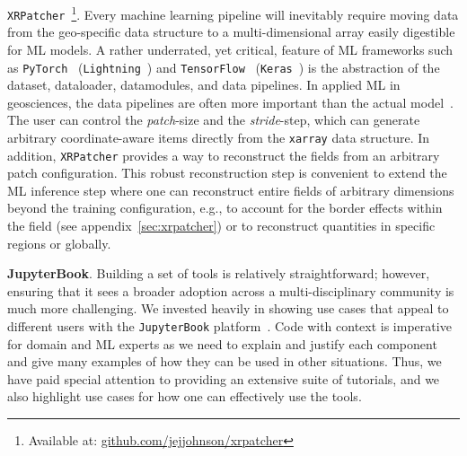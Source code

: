 \texttt{XRPatcher}~\footnote{Available at: \href{https://github.com/jejjohnson/xrpatcher/}{github.com/jejjohnson/xrpatcher}}. 
Every machine learning pipeline will inevitably require moving data from the geo-specific data structure to a multi-dimensional array easily digestible for ML models. 
A rather underrated, yet critical, feature of ML frameworks such as \texttt{PyTorch}~\cite{PYTORCH} (\texttt{Lightning}~\cite{LIGHTNING}) and \texttt{TensorFlow}~\cite{TENSORFLOW} (\texttt{Keras}~\cite{KERAS}) is the abstraction of the dataset, dataloader, datamodules, and data pipelines. 
In applied ML in geosciences, the data pipelines are often more important than the actual model~\cite{DATA4ML}. 
The user can control the \textit{patch}-size and the \textit{stride}-step, which can generate arbitrary coordinate-aware items directly from the \texttt{xarray} data structure. 
In addition, \texttt{XRPatcher} provides a way to reconstruct the fields from an arbitrary patch configuration.
This robust reconstruction step is convenient to extend the ML inference step where one can reconstruct entire fields of arbitrary dimensions beyond the training configuration, e.g., to account for the border effects within the field (see appendix~\ref{sec:xrpatcher}) or to reconstruct quantities in specific regions or globally. 

\textbf{JupyterBook}.
Building a set of tools is relatively straightforward; however, ensuring that it sees a broader adoption across a multi-disciplinary community is much more challenging. 
We invested heavily in showing use cases that appeal to different users with the \texttt{JupyterBook} platform~\cite{JupyterBook}. 
Code with context is imperative for domain and ML experts as we need to explain and justify each component and give many examples of how they can be used in other situations. 
Thus, we have paid special attention to providing an extensive suite of tutorials, and we also highlight use cases for how one can effectively use the tools. 
